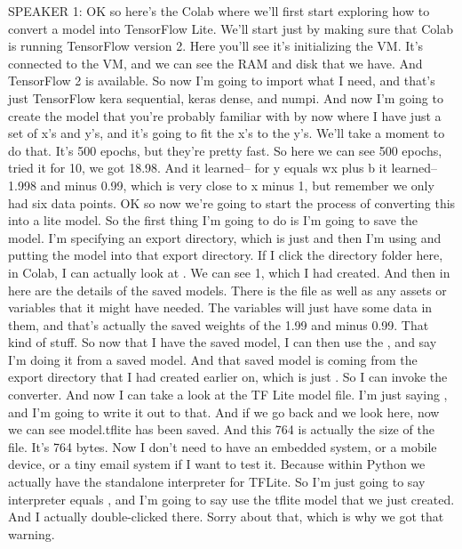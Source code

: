 SPEAKER 1: OK so here's the Colab where we'll first
start exploring how to convert a model into TensorFlow Lite.
We'll start just by making sure that Colab is running TensorFlow version 2.
Here you'll see it's initializing the VM.
It's connected to the VM, and we can see the RAM and disk that we have.
And TensorFlow 2 is available.
So now I'm going to import what I need, and that's just TensorFlow kera
sequential, keras dense, and numpi.
And now I'm going to create the model that you're probably familiar with
by now where I have just a set of x's and y's, and it's going to fit
the x's to the y's.
We'll take a moment to do that.
It's 500 epochs, but they're pretty fast.
So here we can see 500 epochs, tried it for 10, we got 18.98.
And it learned-- for y equals wx plus b it learned--
1.998 and minus 0.99, which is very close to x minus 1, but remember we
only had six data points.
OK so now we're going to start the process of converting this
into a lite model.
So the first thing I'm going to do is I'm going to save the model.
I'm specifying an export directory, which is just  and then
I'm using  and putting the model into that export
directory.
If I click the directory folder here, in Colab,
I can actually look at .
We can see 1, which I had created.
And then in here are the details of the saved models.
There is the  file as well as any assets or variables that it might have
needed.
The variables will just have some data in them,
and that's actually the saved weights of the 1.99 and minus 0.99.
That kind of stuff.
So now that I have the saved model, I can then
use the , and say I'm doing it from a saved model.
And that saved model is coming from the export directory that I had created
earlier on, which is just .
So I can invoke the converter.
And now I can take a look at the TF Lite model file.
I'm just saying ,
and I'm going to write it out to that.
And if we go back and we look here, now we can see model.tflite has been saved.
And this 764 is actually the size of the file.
It's 764 bytes.
Now I don't need to have an embedded system, or a mobile device,
or a tiny email system if I want to test it.
Because within Python we actually have the standalone interpreter for TFLite.
So I'm just going to say interpreter equals ,
and I'm going to say use the tflite model that we just created.
And I actually double-clicked there.
Sorry about that, which is why we got that warning.
